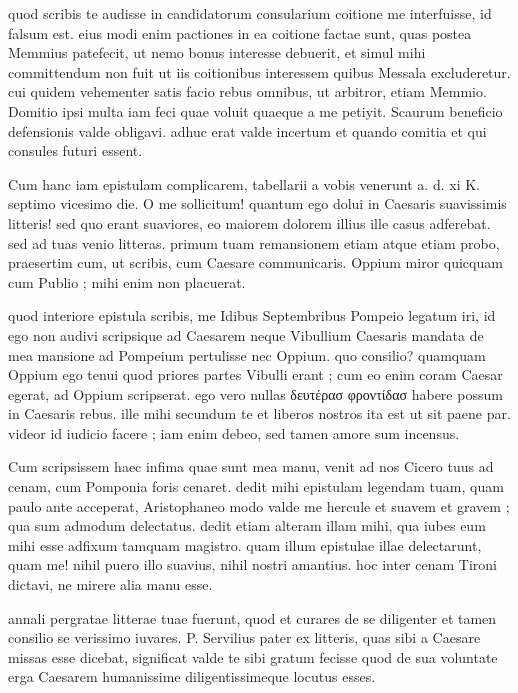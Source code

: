  quod scribis te audisse in candidatorum consularium coitione me interfuisse, id falsum est. eius modi enim pactiones in ea coitione factae sunt, quas postea Memmius patefecit, ut nemo bonus interesse debuerit, et simul mihi committendum non fuit ut iis coitionibus interessem quibus Messala excluderetur. cui quidem vehementer satis facio rebus omnibus, ut arbitror, etiam Memmio. Domitio ipsi multa iam feci quae voluit quaeque a me petiyit. Scaurum beneficio defensionis valde obligavi. adhuc erat valde incertum et quando comitia et qui consules futuri essent.

 Cum hanc iam epistulam complicarem, tabellarii a vobis venerunt a. d. xi K. septimo vicesimo die. O me sollicitum! quantum ego dolui in Caesaris suavissimis litteris! sed quo erant suaviores, eo maiorem dolorem illius ille casus adferebat. sed ad tuas venio litteras. primum tuam remansionem etiam atque etiam probo, praesertim cum, ut scribis, cum Caesare communicaris. Oppium miror quicquam cum Publio ; mihi enim non placuerat.

 quod interiore epistula scribis, me Idibus Septembribus Pompeio legatum iri, id ego non audivi scripsique ad Caesarem neque Vibullium Caesaris mandata de mea mansione ad Pompeium pertulisse nec Oppium. quo consilio? quamquam Oppium ego tenui quod priores partes Vibulli erant ; cum eo enim coram Caesar egerat, ad Oppium scripserat. ego vero nullas δευτέρασ φροντίδασ habere possum in Caesaris rebus. ille mihi secundum te et liberos nostros ita est ut sit paene par. videor id iudicio facere ; iam enim debeo, sed tamen amore sum incensus.

 Cum scripsissem haec infima quae sunt mea manu, venit ad nos Cicero tuus ad cenam, cum Pomponia foris cenaret. dedit mihi epistulam legendam tuam, quam paulo ante acceperat, Aristophaneo modo valde me hercule et suavem et gravem ; qua sum admodum delectatus. dedit etiam alteram illam mihi, qua iubes eum mihi esse adfixum tamquam magistro. quam illum epistulae illae delectarunt, quam me! nihil puero illo suavius, nihil nostri amantius. hoc inter cenam Tironi dictavi, ne mirere alia manu esse.

 annali pergratae litterae tuae fuerunt, quod et curares de se diligenter et tamen consilio se verissimo iuvares. P. Servilius pater ex litteris, quas sibi a Caesare missas esse dicebat, significat valde te sibi gratum fecisse quod de sua voluntate erga Caesarem humanissime diligentissimeque locutus esses.

